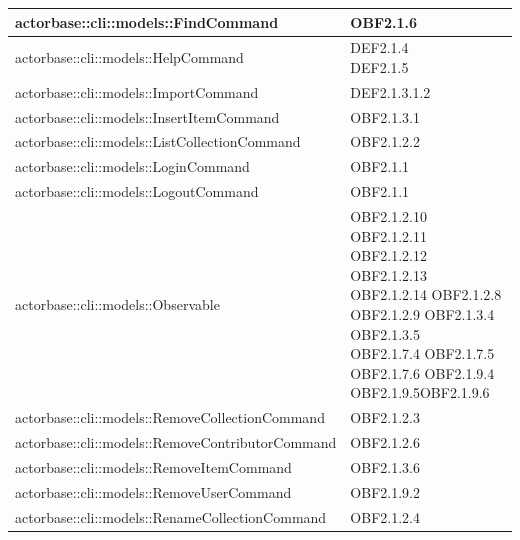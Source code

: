 \documentclass{scalatekids-article}
\begin{document}
\begin{longtable}[H]{|p{12cm}|p{5.5cm}|}
  \hline
  actorbase::cli::models::FindCommand & \multiLineCell[t]{OBF2.1.6\\}\\
  \hline
  actorbase::cli::models::HelpCommand & \multiLineCell[t]{DEF2.1.4\\DEF2.1.5\\}\\
  \hline
  actorbase::cli::models::ImportCommand & \multiLineCell[t]{DEF2.1.3.1.2\\}\\
  \hline
  actorbase::cli::models::InsertItemCommand & \multiLineCell[t]{OBF2.1.3.1\\}\\
  \hline
  actorbase::cli::models::ListCollectionCommand & \multiLineCell[t]{OBF2.1.2.2\\}\\
  \hline
  actorbase::cli::models::LoginCommand & \multiLineCell[t]{OBF2.1.1\\}\\
  \hline
  actorbase::cli::models::LogoutCommand & \multiLineCell[t]{OBF2.1.1\\}\\
  \hline
  actorbase::cli::models::Observable & \multiLineCell[t]{OBF2.1.2.10 OBF2.1.2.11\\OBF2.1.2.12 OBF2.1.2.13\\OBF2.1.2.14 OBF2.1.2.8\\OBF2.1.2.9 OBF2.1.3.4\\OBF2.1.3.5\\OBF2.1.7.4 OBF2.1.7.5\\OBF2.1.7.6 OBF2.1.9.4\\OBF2.1.9.5OBF2.1.9.6\\}\\
  \hline
  actorbase::cli::models::RemoveCollectionCommand & \multiLineCell[t]{OBF2.1.2.3\\}\\
  \hline
  actorbase::cli::models::RemoveContributorCommand & \multiLineCell[t]{OBF2.1.2.6\\}\\
  \hline
  actorbase::cli::models::RemoveItemCommand & \multiLineCell[t]{OBF2.1.3.6\\}\\
  \hline
  actorbase::cli::models::RemoveUserCommand & \multiLineCell[t]{OBF2.1.9.2\\}\\
  \hline
  actorbase::cli::models::RenameCollectionCommand & \multiLineCell[t]{OBF2.1.2.4\\}\\

\end{longtable}
\end{document}
